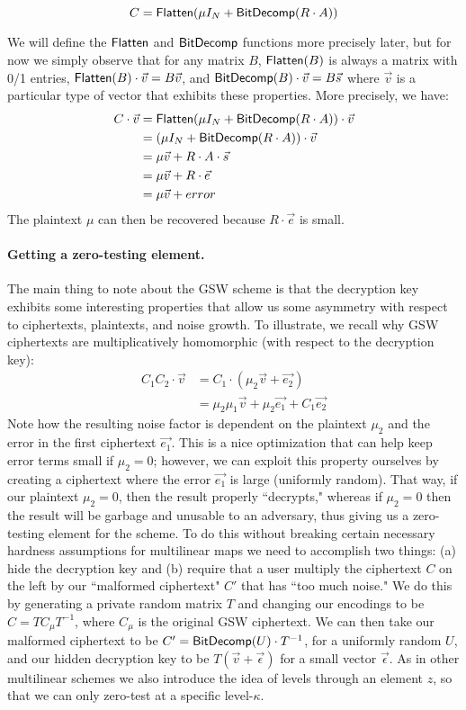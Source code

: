 $$C = \mathsf{Flatten}(\mu I_N + \mathsf{BitDecomp}(R\cdot A))$$

We will define the $\mathsf{Flatten}$ and $\mathsf{BitDecomp}$ functions more precisely later, but for now we simply observe that for any matrix $B$, $\mathsf{Flatten}(B)$ is always a matrix with 0/1 entries, $\mathsf{Flatten}(B)\cdot \vec{v} = B\vec{v}$, and $\mathsf{BitDecomp}(B)\cdot \vec{v} = B\vec{s}$ where $\vec{v}$ is a particular type of vector that exhibits these properties.  More precisely, we have:
\begin{align*}
C\cdot \vec{v} &= \mathsf{Flatten}(\mu I_N + \mathsf{BitDecomp}(R\cdot A))\cdot \vec{v}\\
&= (\mu I_N + \mathsf{BitDecomp}(R\cdot A))\cdot \vec{v}\\
&= \mu \vec{v} + R\cdot A \cdot \vec{s} \\
&= \mu \vec{v} + R\cdot \vec{e}\\
&= \mu \vec{v} + error
\end{align*}
The plaintext $\mu$ can then be recovered because $R\cdot \vec{e}$ is small.    

\paragraph{Getting a zero-testing element.}
The main thing to note about the GSW scheme is that the decryption key exhibits some interesting properties that allow us some asymmetry with respect to ciphertexts, plaintexts, and noise growth.  To illustrate, we recall why GSW ciphertexts are multiplicatively homomorphic (with respect to the decryption key):
\begin{align*}
C_1C_2\cdot \vec{v} &= C_1\cdot (\mu_2 \vec{v} + \vec{e_2})\\
&= \mu_2\mu_1 \vec{v} + \mu_2\vec{e_1}+ C_1\vec{e_2}
\end{align*}
Note how the resulting noise factor is dependent on the plaintext $\mu_2$ and the error in the first ciphertext $\vec{e_1}$.  This is a nice optimization that can help keep error terms small if $\mu_2 = 0$; however, we can exploit this property ourselves by creating a ciphertext where the error $\vec{e_1}$ is large (uniformly random).  That way, if our plaintext $\mu_2 = 0$, then the result properly ``decrypts," whereas if $\mu_2 = 0$ then the result will be garbage and unusable to an adversary, thus giving us a zero-testing element for the scheme.  To do this without breaking certain necessary hardness assumptions for multilinear maps we need to accomplish two things: (a) hide the decryption key and (b) require that a user multiply the ciphertext $C$ on the left by our ``malformed ciphertext" $C'$ that has ``too much noise."  We do this by generating a private random matrix $T$ and changing our encodings to be $C = TC_\mu T^{-1}$, where $C_\mu$ is the original GSW ciphertext.  We can then take our malformed ciphertext to be $C' = \mathsf{BitDecomp}(U)\cdot T^{-1}$, for a uniformly random $U$, and our hidden decryption key to be $T(\vec{v} + \vec{\epsilon})$ for a small vector $\vec{\epsilon}$.  As in other multilinear schemes we also introduce the idea of levels through an element $z$, so that we can only zero-test at a specific level-$\kappa$. 
